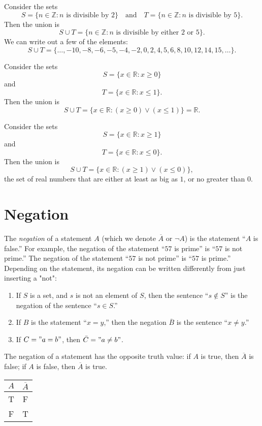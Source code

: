 \documentclass[11pt,dvipsnames]{book}
\numberwithin{figure}{section} %
\numberwithin{table}{section} %
\begin{document}
\begin{example}
Consider the sets
\[
    S = \{n \in \mathbb{Z} : n\text{ is divisible by }2\}\quad \text{and}\quad T = \{n \in \mathbb{Z} : n\text{ is divisible by }5\}.
\]
Then the union is
\[
    S \cup T = \{n \in \mathbb{Z} : n\text{ is divisible by either }2\text{ or }5\}.
\]
We can write out a few of the elements:
\[
    S \cup T =\{\dots,-10,-8,-6,-5,-4,-2,0,2,4,5,6,8,10,12,14,15,\dots\}.
\]
\end{example}

\begin{example}
Consider the sets
\[
    S = \{x \in \mathbb{R} : x \geq 0\}
\]
and
\[
    T = \{x \in \mathbb{R} : x \leq 1\}.
\]
Then the union is
\[
    S \cup T = \{x \in \mathbb{R} : (x \geq 0) \vee (x \leq 1) \} = \mathbb{R}.
\]
\end{example}

\begin{example}
Consider the sets
\[
    S = \{x \in \mathbb{R} : x \geq 1\}
\]
and
\[
    T = \{x \in \mathbb{R} : x \leq 0\}.
\]
Then the union is
\[
    S \cup T = \{x \in \mathbb{R} : (x \geq 1)\vee(x \leq 0) \},
\]
the set of real numbers that are either at least as big as $1$, or no greater than $0$.
\end{example}

\section{Negation}

The \emph{negation} of a statement $A$ (which we denote $\overline{A}$ or $\neg A$) is the statement ``$A$ is false.''
For example, the negation of the statement ``$57$ is prime'' is ``$57$ is not prime.''
The negation of the statement ``$57$ is not prime'' is ``$57$ is prime.''
Depending on the statement, its negation can be written differently from just inserting a "not":
\begin{enumerate}[label=(\alph*)]
\item If $S$ is a set, and $s$ is not an element of $S$, then the sentence ``$s \notin S$'' is the negation of the sentence ``$s \in S$.''
\item If $B$ is the statement ``$x = y$,'' then the negation $\overline{B}$ is the sentence ``$x \neq y$.''
\item If $C="a=b"$, then $\bar{C}="a\neq b"$.
\end{enumerate}

The negation of a statement has the opposite truth value: if $A$ is true, then $\overline{A}$ is false; if $A$ is false, then $\overline{A}$ is true.
\begin{center}
    \begin{tabular}{ c|c}
        $A$ & $\overline{A}$   \\ \hline 
        T & F \\
        F & T \\
    \end{tabular}
\end{center}
\end{document}
